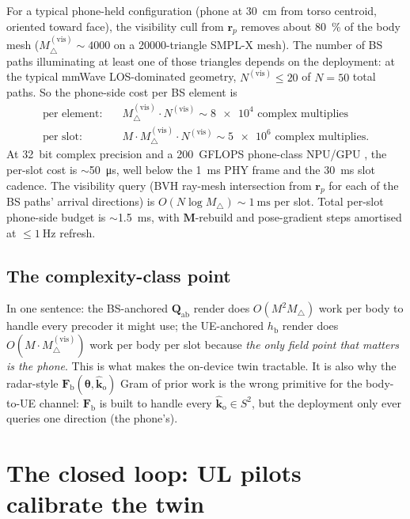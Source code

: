 \documentclass[11pt,a4paper]{article}
\theoremstyle{definition}
\newcommand{\rr}{\mathbf{r}}
\newcommand{\Qabs}{\mathbf{Q}_{\mathrm{ab}}}
\newcommand{\Mmat}{\mathbf{M}}
\newcommand{\thetab}{\bm{\theta}}
\newcommand{\hbody}{h_{\mathrm{b}}}
\newcommand{\Frib}{\mathbf{F}_{\mathrm{b}}}
\newcommand{\kout}{\hat{\bm{k}}_{\mathrm{o}}}
\begin{document}
For a typical phone-held configuration (phone at \SI{30}{\cm} from
torso centroid, oriented toward face), the visibility cull from
$\rr_p$ removes about \SI{80}{\percent} of the body mesh
($M_\triangle^{(\mathrm{vis})}\sim\num{4000}$ on a
\num{20000}-triangle SMPL-X mesh).  The number of BS paths
illuminating at least one of those triangles depends on the
deployment: at the typical mmWave LOS-dominated geometry,
$N^{(\mathrm{vis})}\le\num{20}$ of $N=50$ total paths.  So the
phone-side cost per BS element is
\begin{align*}
  \text{per element}: \quad &
  M_\triangle^{(\mathrm{vis})}\cdot N^{(\mathrm{vis})}\sim\num{8e4}
  \text{ complex multiplies}\\
  \text{per slot}: \quad & M\cdot M_\triangle^{(\mathrm{vis})}\cdot N^{(\mathrm{vis})}
  \sim \num{5e6} \text{ complex multiplies}.
\end{align*}
At \SI{32}{bit} complex precision and a \SI{200}{GFLOPS} phone-class
NPU/GPU \cite{Apple2024A18}, the per-slot cost is
$\sim$\SI{50}{\micro\second}, well below the \SI{1}{\milli\second}
PHY frame and the \SI{30}{\milli\second} slot cadence.  The
visibility query (BVH ray-mesh intersection from $\rr_p$ for each
of the BS paths' arrival directions) is
$O(N\log M_\triangle)\sim\SI{1}{\milli\second}$ per slot.  Total
per-slot phone-side budget is $\sim$\SI{1.5}{\milli\second}, with
$\Mmat$-rebuild and pose-gradient steps amortised at
$\le\SI{1}{\Hz}$ refresh.

\subsection{The complexity-class point}

In one sentence: the BS-anchored $\Qabs$ render does
$O(M^2 M_\triangle)$ work per body to handle every precoder it
might use; the UE-anchored $\hbody$ render does
$O(M\cdot M_\triangle^{(\mathrm{vis})})$ work per body per slot
because \emph{the only field point that matters is the phone}.
This is what makes the on-device twin tractable.  It is also why
the radar-style $\Frib(\thetab,\kout)$ Gram of prior work is the
wrong primitive for the body-to-UE channel: $\Frib$ is built to
handle every $\kout\in S^2$, but the deployment only ever
queries one direction (the phone's).

\section{The closed loop: UL pilots calibrate the twin}\label{sec:closedloop}
\end{document}
